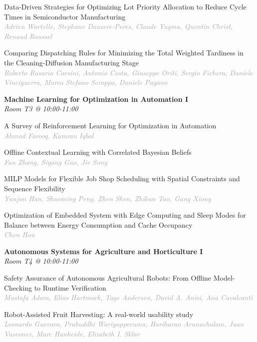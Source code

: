\begin{multicols*}{2}
\small Data-Driven Strategies for Optimizing Lot Priority Allocation to Reduce Cycle Times in Semiconductor Manufacturing\\ 
\footnotesize \textcolor{darkgray}{\textit{Adrien Wartelle, Stephane  Dauzere-Peres, Claude  Yugma, Quentin  Christ, Renaud  Roussel}}

\small Comparing Dispatching Rules for Minimizing the Total Weighted Tardiness in the Cleaning-Diffusion Manufacturing Stage\\ 
\footnotesize \textcolor{darkgray}{\textit{Roberto Rosario Corsini, Antonio  Costa, Giuseppe  Oriti, Sergio  Fichera, Daniele  Vinciguerra, Marco Stefano  Scroppo, Daniele  Pagano}}

\normalsize \textbf{Machine Learning for Optimization in Automation I}\\
\small \textit{Room T3 @ 10:00-11:00}

\small A Survey of Reinforcement Learning for Optimization in Automation\\ 
\footnotesize \textcolor{darkgray}{\textit{Ahmad Farooq, Kamran  Iqbal}}

\small Offline Contextual Learning with Correlated Bayesian Beliefs\\ 
\footnotesize \textcolor{darkgray}{\textit{Fan Zhang, Siyang  Gao, Jie  Song}}

\small MILP Models for Flexible Job Shop Scheduling with Spatial Constraints and Sequence Flexibility\\ 
\footnotesize \textcolor{darkgray}{\textit{Yunjun Han, Shaoming  Peng, Zhen  Shen, Zhikun  Tao, Gang  Xiong}}

\small Optimization of Embedded System with Edge Computing and Sleep Modes for Balance between Energy Consumption and Cache Occupancy\\ 
\footnotesize \textcolor{darkgray}{\textit{Chen Hou}}

\normalsize \textbf{Autonomous Systems for Agriculture and Horticulture I}\\
\small \textit{Room T4 @ 10:00-11:00}

\small Safety Assurance of Autonomous Agricultural Robots: From Offline Model-Checking to Runtime Verification\\ 
\footnotesize \textcolor{darkgray}{\textit{Mustafa Adam, Elias  Hartmark, Tage  Andersen, David A.  Anisi, Ana  Cavalcanti}}

\small Robot-Assisted Fruit Harvesting: A real-world usability study\\ 
\footnotesize \textcolor{darkgray}{\textit{Leonardo Guevara, Prabuddhi  Wariyapperuma, Hariharan  Arunachalam, Juan  Vasconez, Marc  Hanheide, Elizabeth I.  Sklar}}


\end{multicols*}
